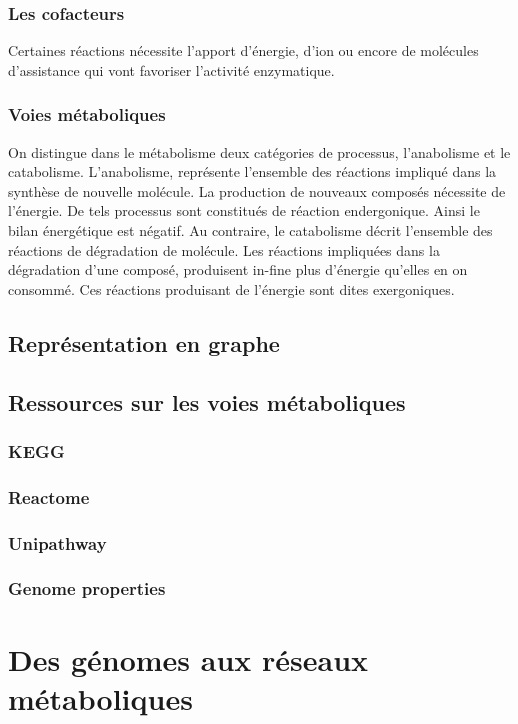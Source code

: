 \begin{refsection}
    \subsubsection{Les cofacteurs}
    Certaines réactions nécessite l’apport d'énergie, d’ion ou encore de molécules d'assistance qui vont favoriser l’activité enzymatique.
    
    
    \subsubsection{Voies métaboliques}
    On distingue dans le métabolisme deux catégories de processus, l'anabolisme et le catabolisme. L'anabolisme, représente l'ensemble des réactions impliqué dans la synthèse de nouvelle molécule. La production de nouveaux composés nécessite de l'énergie. De tels processus sont constitués de réaction endergonique. Ainsi le bilan énergétique est négatif.  Au contraire, le catabolisme décrit l'ensemble des réactions de dégradation de molécule. Les réactions impliquées dans la dégradation d'une composé, produisent in-fine plus d'énergie qu'elles en on consommé. Ces réactions produisant de l'énergie sont dites exergoniques.
    
    
    \subsection{Représentation en graphe}
    \subsection{Ressources sur les voies métaboliques}
    \subsubsection{KEGG}
    \subsubsection{Reactome}
    \subsubsection{Unipathway}
    \subsubsection{Genome properties}
    
    \section{Des génomes aux réseaux métaboliques}
    

\end{refsection}
